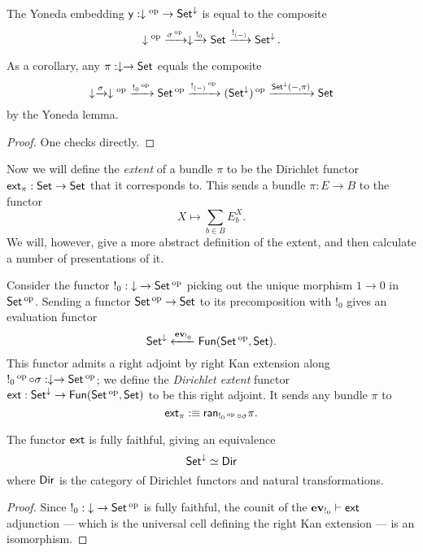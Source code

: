 \begin{lem}\label{lem:set.bundle.yoneda}
The Yoneda embedding $\yo : \downarrow\op \to \Set^{\downarrow}$ is equal to the
composite $$\downarrow\op \xto{\sigma\op} \downarrow \xto{!_{0}} \Set
\xto{!_{(-)}} \Set^{\downarrow}.$$

As a corollary, any $\pi : \downarrow \to \Set$ equals the composite
$$\downarrow \xto{\sigma} \downarrow\op \xto{!_0\op} \Set\op \xto{!_{(-)}\op}
(\Set^{\downarrow})\op \xto{\Set^{\downarrow}(-, \pi)} \Set$$
by the Yoneda lemma.
\end{lem}
\begin{proof}
One checks directly.
\end{proof}

Now we will define the \emph{extent} of a bundle $\pi$ to be the Dirichlet functor $\ext_\pi: \Set\to\Set$ that it
corresponds to. This sends a bundle
$\pi : E \to B$ to the functor
$$X \mapsto \sum_{b \in B} E_b^X.$$
We will, however, give a more abstract definition of the extent, and then
calculate a number of presentations of it.

\begin{defn}\label{def.extent}
  Consider the functor $!_0 : \down \to \Set\op$ picking out the unique morphism $1\to 0$ in $\Set\op$. Sending a functor $\Set\op\to\Set$ to its precomposition with $!_0$ gives an evaluation functor
  $$\Set^{\down} \xleftarrow{\ev_{!_0}} \Fun(\Set\op, \Set).$$
  This functor admits a right adjoint by right Kan extension along $!_0\op \circ
  \sigma : \downarrow \to \Set\op$; we define the
  \emph{Dirichlet extent} functor $\ext : \Set^{\down} \to \Fun(\Set\op,
  \Set)$ to be this right adjoint. It sends any bundle $\pi$ to
  $$\ext_{\pi} :\equiv \term{ran}_{!_0\op \circ \sigma} \pi.$$
\end{defn}

\begin{prop}
  The functor $\ext$ is fully faithful, giving an equivalence
  $$\Set^{\down} \simeq \Dir$$
  where $\Dir$ is the category of Dirichlet functors and natural transformations.
\end{prop}
\begin{proof}
Since $!_0 : \down \to \Set\op$ is fully faithful, the counit of the
$\ev_{!_0} \vdash \ext$ adjunction --- which is the universal cell defining the
right Kan extension --- is an isomorphism. 
\end{proof}

